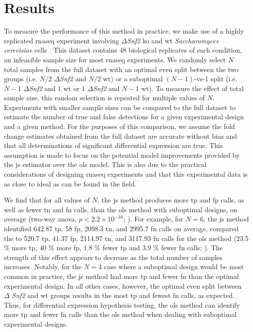 \section{Results}

To measure the performance of this method in practice, we make use of a highly replicated \gls{rnaseq} experiment involving $\Delta$\emph{Snf2} \gls{ko} and \gls{wt} \emph{Saccharomyces cerevisiae} cells \cite{gierlinskiStatisticalModelsRNAseq2015}.
This dataset contains 48 biological replicates of each condition, an infeasible sample size for most \gls{rnaseq} experiments.
We randomly select $N$ total samples from the full dataset with an optimal even split between the two groups (i.e. $N / 2$ $\Delta$\emph{Snf2} and $N / 2$ \gls{wt}) or a suboptimal $(N - 1)$-vs-1 split (i.e. $N - 1$ $\Delta$\emph{Snf2} and 1 \gls{wt} or 1 $\Delta$\emph{Snf2} and $N - 1$ \gls{wt}).
To measure the effect of total sample size, this random selection is repeated for multiple values of $N$.
Experiments with smaller sample sizes can be compared to the full dataset to estimate the number of true and false detections for a given experimental design and a given method.
For the purposes of this comparison, we assume the fold change estimates obtained from the full dataset are accurate without bias and that all determinations of significant differential expression are true.
This assumption is made to focus on the potential model improvements provided by the \gls{js} estimator over the \gls{ols} model.
This is also due to the practical considerations of designing \gls{rnaseq} experiments and that this experimental data is as close to ideal as can be found in the field.

We find that for all values of $N$, the \gls{js} method produces more \gls{tp} and \gls{fp} calls, as well as fewer \gls{tn} and \gls{fn} calls, than the \gls{ols} method with suboptimal designs, on average (two-way \gls{anova}, $p < 2.2 \times 10^{-16}$; ).
For example, for $N = 6$, the \gls{js} method identified 642.87 \gls{tp}, 58 \gls{fp}, 2098.3 \gls{tn}, and 2995.7 \gls{fn} calls on average, compared the to 520.7 \gls{tp}, 41.37 \gls{fp}, 2114.97 \gls{tn}, and 3117.93 \gls{fn} calls for the \gls{ols} method (23.5 \% more \gls{tp}, 40 \% more \gls{fp}, 1.8 \% fewer \gls{tp} and 3.9 \% fewer \gls{fn} calls; ).
The strength of this effect appears to decrease as the total number of samples increases.
Notably, for the $N = 4$ case where a suboptimal design would be most common in practice, the \gls{js} method had more \gls{tp} and fewer \gls{fn} than the optimal experimental design.
In all other cases, however, the optimal even split between $\Delta $ \emph{Snf2} and \gls{wt} groups results in the most \gls{tp} and fewest \gls{fn} calls, as expected.
Thus, for differential expression hypothesis testing, the \gls{ols} method can identify more \gls{tp} and fewer \gls{fn} calls than the \gls{ols} method when dealing with suboptimal experimental designs.

